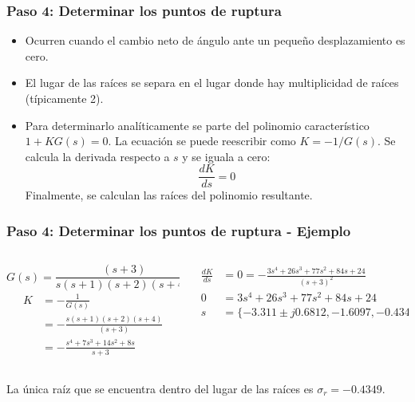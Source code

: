 \documentclass[aspectratio=169,handout]{beamer}
\theoremstyle{definition}
\theoremstyle{plain}
\theoremstyle{remark}
\begin{document}
\begin{frame}[c]\frametitle{Paso 4: Determinar los puntos de ruptura}
	\begin{itemize}
		\item Ocurren cuando el cambio neto de ángulo ante un pequeño desplazamiento es cero.
		\item El lugar de las raíces se separa en el lugar donde hay multiplicidad de raíces (típicamente 2).
		\item Para determinarlo analíticamente se parte del polinomio característico $1 + KG(s) = 0$. La ecuación se puede reescribir como $K = -1/G(s)$. Se calcula la derivada respecto a $s$ y se iguala a cero:
		\begin{equation*}
			\frac{dK}{ds} = 0
		\end{equation*}
		Finalmente, se calculan las raíces del polinomio resultante.
	\end{itemize}
\end{frame}

\begin{frame}[c]\frametitle{Paso 4: Determinar los puntos de ruptura - Ejemplo}
\vspace*{5mm}
\begin{columns}
	\begin{column}{0.5\textwidth}
	\begin{equation*}
		G(s) = \frac{(s+3)}{s(s+1)(s+2)(s+4)}
	\end{equation*}
	\begin{align*}
		K &= -\frac{1}{G(s)}\\
		&= -\frac{s(s+1)(s+2)(s+4)}{(s+3)}\\
		&= -\frac{s^4+7s^3 + 14s^2 + 8s}{s+3}
	\end{align*}
	\end{column}
	\begin{column}{0.5\textwidth}
	\begin{align*}
		\frac{dK}{ds} &= 0 = -\frac{3s^4 + 26s^3 + 77s^2 + 84s + 24}{(s+3)^2}\\
		0 &= 3s^4 + 26s^3 + 77s^2 + 84s + 24\\
		s &= \{ -3.311 \pm j0.6812, -1.6097, -0.4349 \}
	\end{align*}
	\end{column}
\end{columns}
\vspace*{5mm}
La única raíz que se encuentra dentro del lugar de las raíces es $\sigma_r = -0.4349$.
\end{frame}
\end{document}
